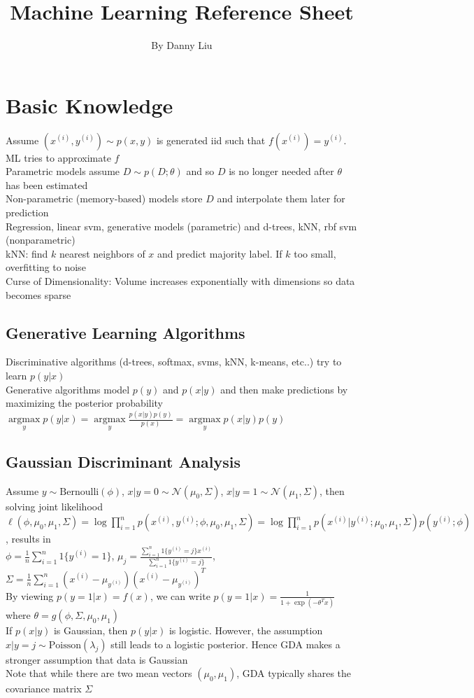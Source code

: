 \documentclass{article}
\title{Machine Learning Reference Sheet}
\author{By Danny Liu}
\date{}
\DeclareMathOperator*{\argmax}{argmax}
\begin{document}
\maketitle

\section{Basic Knowledge}
Assume $(x^{(i)}, y^{(i)}) \sim p(x,y)$ is generated iid such that $f(x^{(i)}) = y^{(i)}$. ML tries to approximate $f$ \\
Parametric models assume $D \sim p(D; \theta)$ and so $D$ is no longer needed after $\theta$ has been estimated \\
Non-parametric (memory-based) models store $D$ and interpolate them later for prediction \\
Regression, linear svm, generative models (parametric) and d-trees, kNN, rbf svm (nonparametric) \\
kNN: find $k$ nearest neighbors of $x$ and predict majority label. If $k$ too small, overfitting to noise \\
Curse of Dimensionality: Volume increases exponentially with dimensions so data becomes sparse 

\subsection{Generative Learning Algorithms}
Discriminative algorithms (d-trees, softmax, svms, kNN, k-means, etc..) try to learn $p(y|x)$ \\
Generative algorithms model $p(y)$ and $p(x|y)$ and then make predictions by maximizing the posterior probability $\argmax\limits_y p(y|x) = \argmax\limits_y \frac{p(x|y)p(y)}{p(x)} = \argmax\limits_y p(x|y)p(y)$ 

\subsection{Gaussian Discriminant Analysis}
Assume $y \sim \mbox{Bernoulli}(\phi)$, $x|y=0 \sim \mathcal{N}(\mu_0, \Sigma)$, $x|y=1 \sim \mathcal{N}(\mu_1, \Sigma)$, then solving joint likelihood \\
$\ell(\phi, \mu_0, \mu_1, \Sigma) = \log \prod\limits_{i=1}^np(x^{(i)}, y^{(i)}; \phi, \mu_0, \mu_1, \Sigma) = \log \prod\limits_{i=1}^np(x^{(i)} | y^{(i)}; \mu_0, \mu_1, \Sigma)p(y^{(i)}; \phi)$, results in \\
$\phi = \frac{1}{n}\sum\limits_{i=1}^n 1\{y^{(i)} = 1\}$, $\mu_j = \frac{\sum_{i=1}^n 1\{y^{(i)} = j\} x^{(i)}} {\sum_{i=1}^n 1\{y^{(i)} = j\}}$, $\Sigma = \frac{1}{n}\sum\limits_{i=1}^n (x^{(i)} - \mu_{y^{(i)}})(x^{(i)} - \mu_{y^{(i)}})^T$ \\
By viewing $p(y=1|x) = f(x)$, we can write $p(y=1|x) = \frac{1}{1+\exp(-\theta^Tx)}$ where $\theta = g(\phi, \Sigma, \mu_0, \mu_1)$ \\
If $p(x|y)$ is Gaussian, then $p(y|x)$ is logistic. However, the assumption  $x|y = j \sim \mbox{Poisson}(\lambda_j)$ still leads to a logistic posterior. Hence GDA makes a stronger assumption that data is Gaussian \\
Note that while there are two mean vectors $(\mu_0, \mu_1)$, GDA typically shares the covariance matrix $\Sigma$
\end{document}
